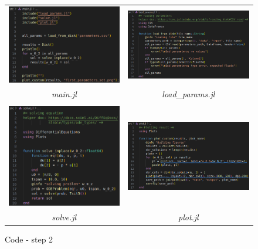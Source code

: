 \documentclass[11pt]{article}
\begin{document}
					\begin{figure}[h!]
							\centering
							\caption{Code - step 2}
							\begin{tabular}{cc}
								\includegraphics[width=7.5cm]{figures/diff_equation/code_main_step_2.png}
								&
								\includegraphics[width=7.5cm]{figures/diff_equation/code_load_params_step_2} \\
								\textit{main.jl}
								&
								\textit{load\_params.jl} \\
								\\
								\includegraphics[width=7.5cm]{figures/diff_equation/code_solve_step_2}
								&
								\includegraphics[width=7.5cm]{figures/diff_equation/code_plot_step_2} \\
								\textit{solve.jl}
								&
								\textit{plot.jl} \\
							\end{tabular}
							\label{fig:step2_code}
					\end{figure}
\end{document}
